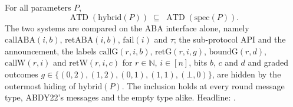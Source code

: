 \begin{theorem}
  \label{thm:aba-hybrid-spec}
  \leanok
  For all parameters $P$,
  \[
    \operatorname{ATD}(\mathrm{hybrid}(P)) \;\subseteq\;
    \operatorname{ATD}(\mathrm{spec}(P)).
  \]
  The two systems are compared on the ABA interface alone, namely $\mathrm{callABA}(i,b)$, $\mathrm{retABA}(i,b)$, $\mathrm{fail}(i)$ and $\tau$; the sub-protocol API and the announcement, the labels $\mathrm{callG}(r,i,b)$, $\mathrm{retG}(r,i,g)$, $\mathrm{boundG}(r,d)$, $\mathrm{callW}(r,i)$ and $\mathrm{retW}(r,i,c)$ for $r \in \mathbb{N}$, $i \in [n]$, bits $b$, $c$ and $d$ and graded outcomes $g \in \{(0,2), (1,2), (0,1), (1,1), (\bot,0)\}$, are hidden by the outermost hiding of $\mathrm{hybrid}(P)$. The inclusion holds at every round message type, ABDY22's messages and the empty type alike.
  Headline: .
\end{theorem}

